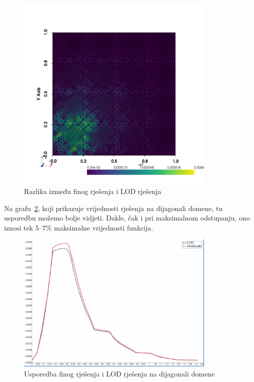 \documentclass[zavrsnirad]{fer}
\begin{document}
\begin{figure}[h]
  \centering
  \includegraphics[width=0.85\textwidth]{Figures/solution_diff.png}
  \caption{Razlika između finog rješenja i LOD rješenja}
  \label{fig:sol_diff}
\end{figure}

Na grafu\ \ref{fig:diag_comp}, koji prikazuje vrijednosti rješenja na dijagonali domene,
tu usporedbu možemo bolje vidjeti. Dakle, čak i pri maksimalnom odstupanju,
ono iznosi tek 5–7\% maksimalne vrijednosti funkcija.

\begin{figure}[h]
  \centering
  \includegraphics[width=0.85\textwidth]{Figures/diag_diff.jpg}
  \caption{Usporedba finog rješenja i LOD rješenja na dijagonali domene}
  \label{fig:diag_comp}
\end{figure}
\end{document}
